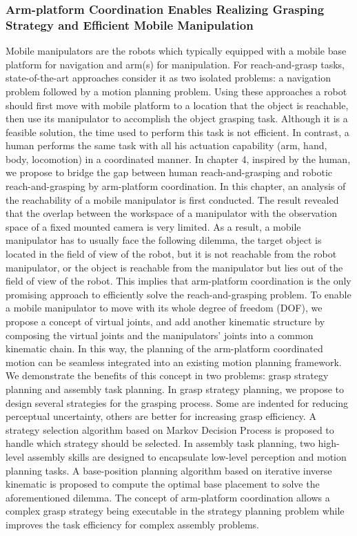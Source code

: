 \subsubsection{Arm-platform Coordination Enables Realizing Grasping Strategy and Efficient Mobile Manipulation}
Mobile manipulators are the robots which typically equipped with a mobile base platform for navigation and arm(s) for manipulation. For reach-and-grasp tasks, state-of-the-art approaches consider it as two isolated problems: a navigation problem followed by a motion planning problem. Using these approaches a robot should first move with mobile platform to a location that the object is reachable, then use its manipulator to accomplish the object grasping task. Although it is a feasible solution, the time used to perform this task is not efficient. In contrast, a human performs the same task with all his actuation capability (arm, hand, body, locomotion) in a coordinated manner. In chapter 4, inspired by the human, we propose to bridge the gap between human reach-and-grasping and robotic reach-and-grasping by arm-platform coordination. In this chapter, an analysis of the reachability of a mobile manipulator is first conducted. The result revealed that the overlap between the workspace of a manipulator with the observation space of a fixed mounted camera is very limited. As a result, a mobile manipulator has to usually face the following dilemma, the target object is located in the field of view of the robot, but it is not reachable from the robot manipulator, or the object is reachable from the manipulator but lies out of the field of view of the robot. This implies that arm-platform coordination is the only promising approach to  efficiently solve the reach-and-grasping problem. To enable a mobile manipulator to move with its whole degree of freedom (DOF), we propose a concept of virtual joints, and add another kinematic structure by composing the virtual joints and the manipulators' joints into a common kinematic chain. In this way, the planning of the arm-platform coordinated motion can be seamless integrated into an existing motion planning framework. We demonstrate the benefits of this concept in two problems: grasp strategy planning and assembly task planning. In grasp strategy planning, we propose to design several strategies for the grasping process. Some are indented for reducing perceptual uncertainty, others are better for increasing grasp efficiency. A strategy selection algorithm based on Markov Decision Process is proposed to handle which strategy should be selected. In assembly task planning, two high-level assembly skills are designed to encapsulate low-level perception and motion planning tasks. A base-position planning algorithm based on iterative inverse kinematic is proposed to compute the optimal base placement to solve the aforementioned dilemma. The concept of arm-platform coordination allows a complex grasp strategy being executable in the strategy planning problem while improves the task efficiency for complex assembly problems.   


